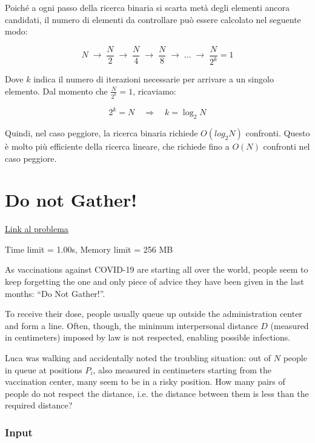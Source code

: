 \medskip

\medskip



\noindent Poiché a ogni passo della ricerca binaria si scarta metà degli elementi ancora candidati, il numero di elementi da controllare può essere calcolato nel seguente modo:

\[
N \;\rightarrow\; \frac{N}{2} \;\rightarrow\; \frac{N}{4} \;\rightarrow\; \frac{N}{8} \;\rightarrow\; \dots \;\rightarrow\; \frac{N}{2^k} = 1
\]

Dove $k$ indica il numero di iterazioni necessarie per arrivare a un singolo elemento.  
Dal momento che \(\frac{N}{2^k} = 1\), ricaviamo:

\[
2^k = N \quad \Rightarrow \quad k = \log_2 N
\]

Quindi, nel caso peggiore, la ricerca binaria richiede $O(log_2 N)$ confronti.  
Questo è molto più efficiente della ricerca lineare, che richiede fino a \(O(N)\) confronti nel caso peggiore.





\newpage
\section{Do not Gather!}

\href{https://training.olinfo.it/task/ois_gatherings}{Link al problema} 

\smallskip

\noindent Time limit = 1.00s, Memory limit = 256 MB

\bigskip

As vaccinations against COVID-19 are starting all over the world, people seem to keep forgetting the one
and only piece of advice they have been given in the last months: “Do Not Gather!”.

\medskip
To receive their dose, people usually queue up outside the administration center and form a line. Often,
though, the minimum interpersonal distance $D$ (measured in centimeters) imposed by law is not respected,
enabling possible infections.

\bigskip
Luca was walking and accidentally noted the troubling situation: out of $N$ people in queue at positions $P_i$, also measured in centimeters starting from the vaccination center, many seem to be in a risky position.
How many pairs of people do not respect the distance, i.e. the distance between them is less than the required distance?

\subsubsection*{Input}  

